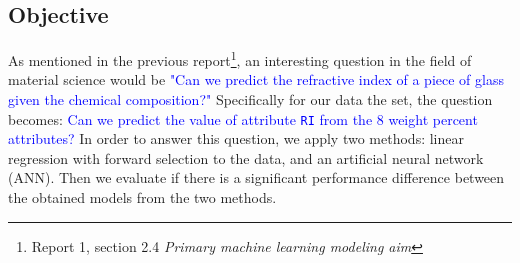 \subsection{Objective}

As mentioned in the previous report\footnote{Report 1, section 2.4 \textit{Primary machine learning modeling aim}}, an interesting question in the field of material science would be \textcolor{blue}{"Can we predict the refractive index of a piece of glass given the chemical
composition?"}
Specifically for our data the set, the question becomes: \textcolor{blue}{Can we predict the value of attribute \texttt{RI} from the 8 weight percent attributes?} In order to answer this question, we apply two methods: linear regression with forward selection to the data, and an artificial neural network (ANN). Then we evaluate if there is a significant performance difference between
the obtained models from the two methods.